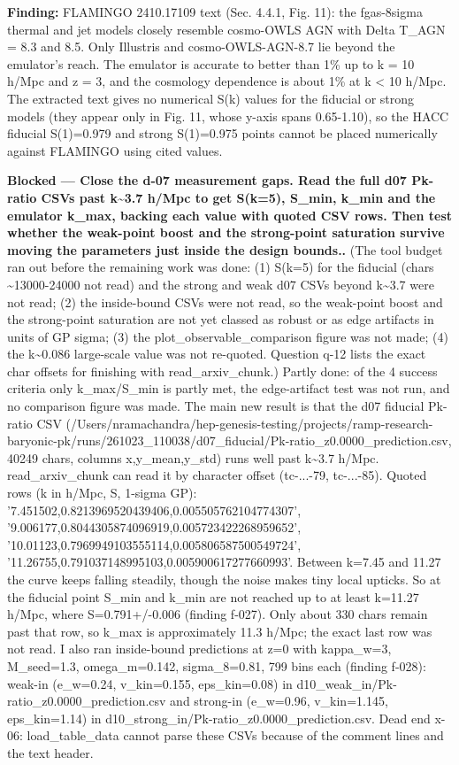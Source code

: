\documentclass[11pt,a4paper]{article}
\begin{document}
\textbf{Finding:} FLAMINGO 2410.17109 text (Sec. 4.4.1, Fig. 11): the fgas-8sigma thermal and jet models closely resemble cosmo-OWLS AGN with Delta T\_AGN = 8.3 and 8.5. Only Illustris and cosmo-OWLS-AGN-8.7 lie beyond the emulator's reach. The emulator is accurate to better than 1\% up to k = 10 h/Mpc and z = 3, and the cosmology dependence is about 1\% at k \textless{} 10 h/Mpc. The extracted text gives no numerical S(k) values for the fiducial or strong models (they appear only in Fig. 11, whose y-axis spans 0.65-1.10), so the HACC fiducial S(1)=0.979 and strong S(1)=0.975 points cannot be placed numerically against FLAMINGO using cited values.

\textbf{Blocked --- Close the d-07 measurement gaps. Read the full d07 Pk-ratio CSVs past k\textasciitilde{}3.7 h/Mpc to get S(k=5), S\_min, k\_min and the emulator k\_max, backing each value with quoted CSV rows. Then test whether the weak-point boost and the strong-point saturation survive moving the parameters just inside the design bounds..} (The tool budget ran out before the remaining work was done: (1) S(k=5) for the fiducial (chars \textasciitilde{}13000-24000 not read) and the strong and weak d07 CSVs beyond k\textasciitilde{}3.7 were not read; (2) the inside-bound CSVs were not read, so the weak-point boost and the strong-point saturation are not yet classed as robust or as edge artifacts in units of GP sigma; (3) the plot\_observable\_comparison figure was not made; (4) the k\textasciitilde{}0.086 large-scale value was not re-quoted. Question q-12 lists the exact char offsets for finishing with read\_arxiv\_chunk.) Partly done: of the 4 success criteria only k\_max/S\_min is partly met, the edge-artifact test was not run, and no comparison figure was made. The main new result is that the d07 fiducial Pk-ratio CSV (/Users/nramachandra/hep-genesis-testing/projects/ramp-research-baryonic-pk/runs/261023\_110038/d07\_fiducial/Pk-ratio\_z0.0000\_prediction.csv, 40249 chars, columns x,y\_mean,y\_std) runs well past k\textasciitilde{}3.7 h/Mpc. read\_arxiv\_chunk can read it by character offset (tc-...-79, tc-...-85). Quoted rows (k in h/Mpc, S, 1-sigma GP): '7.451502,0.8213969520439406,0.005505762104774307', '9.006177,0.8044305874096919,0.005723422268959652', '10.01123,0.7969949103555114,0.005806587500549724', '11.26755,0.791037148995103,0.005900617277660993'. Between k=7.45 and 11.27 the curve keeps falling steadily, though the noise makes tiny local upticks. So at the fiducial point S\_min and k\_min are not reached up to at least k=11.27 h/Mpc, where S=0.791+/-0.006 (finding f-027). Only about 330 chars remain past that row, so k\_max is approximately 11.3 h/Mpc; the exact last row was not read. I also ran inside-bound predictions at z=0 with kappa\_w=3, M\_seed=1.3, omega\_m=0.142, sigma\_8=0.81, 799 bins each (finding f-028): weak-in (e\_w=0.24, v\_kin=0.155, eps\_kin=0.08) in d10\_weak\_in/Pk-ratio\_z0.0000\_prediction.csv and strong-in (e\_w=0.96, v\_kin=1.145, eps\_kin=1.14) in d10\_strong\_in/Pk-ratio\_z0.0000\_prediction.csv. Dead end x-06: load\_table\_data cannot parse these CSVs because of the comment lines and the text header.
\end{document}
